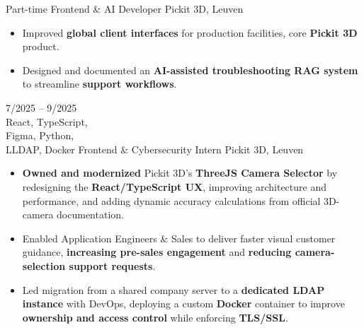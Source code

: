 \documentclass[8pt]{developercv} %
\begin{document}
\begin{entrylist}
		{Part-time Frontend \& AI Developer}
    {Pickit 3D, Leuven}
		{%
      \begin{itemize}[leftmargin=*, itemsep=1pt, topsep=1pt, parsep=0pt, partopsep=0pt]
        \item Improved \textbf{global client interfaces} for production facilities, core \textbf{Pickit 3D} product. 
        \item Designed and documented an \textbf{AI-assisted troubleshooting RAG system} to streamline \textbf{support workflows}.
      \end{itemize}
        }
    \entry
            {7/2025 -- 9/2025\\[3pt]React, TypeScript, \\Figma, Python, \\LLDAP, Docker}
		{Frontend \& Cybersecurity Intern}
		{Pickit 3D, Leuven}
		{%
      \begin{itemize}[leftmargin=*, itemsep=1pt, topsep=1pt, parsep=0pt, partopsep=0pt]
        \item \textbf{Owned and modernized} Pickit 3D's \textbf{ThreeJS Camera Selector} by redesigning the \textbf{React/TypeScript UX}, improving architecture and performance, and adding dynamic accuracy calculations from official 3D-camera documentation.
        \item Enabled Application Engineers \& Sales to deliver faster visual customer guidance, \textbf{increasing pre-sales engagement} and \textbf{reducing camera-selection support requests}.
        \item Led migration from a shared company server to a \textbf{dedicated LDAP instance} with DevOps, deploying a custom \textbf{Docker} container to improve \textbf{ownership and access control} while enforcing \textbf{TLS/SSL}.
      \end{itemize}
        }
\end{entrylist}
\end{document}
